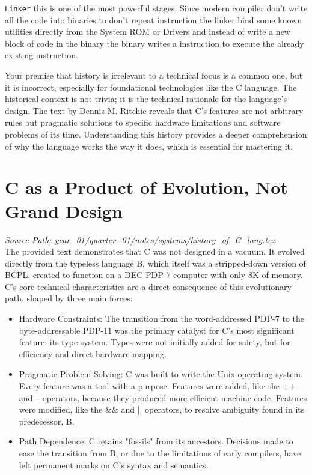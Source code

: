 \documentclass[11pt,a4paper]{report}
\begin{document}
\texttt{Linker} this is one of the most powerful stages. Since modern compiler don't write all the code into binaries to don't repeat instruction the linker bind some known utilities directly from the System ROM or Drivers and instead of write a new block of code in the binary the binary writes a instruction to execute the already existing instruction.



\newpage
Your premise that history is irrelevant to a technical focus is a common one, but it is incorrect, especially for foundational technologies like the C language. The historical context is not trivia; it is the technical rationale for the language's design. The text by Dennis M. Ritchie reveals that C's features are not arbitrary rules but pragmatic solutions to specific hardware limitations and software problems of its time. Understanding this history provides a deeper comprehension of why the language works the way it does, which is essential for mastering it.

\section{C as a Product of Evolution, Not Grand Design}
\noindent\textit{Source Path: \href{https://github.com/TEGDV/QuantitativeSystemsEngineering/blob/main/year_01/quarter_01/notes/systems/history_of_C_lang.tex}{year\_01/quarter\_01/notes/systems/history\_of\_C\_lang.tex}}\\


The provided text demonstrates that C was not designed in a vacuum. It evolved directly from the typeless language B, which itself was a stripped-down version of BCPL, created to function on a DEC PDP-7 computer with only 8K of memory. C's core technical characteristics are a direct consequence of this evolutionary path, shaped by three main forces:

\begin{itemize}
  \item Hardware Constraints: The transition from the word-addressed PDP-7 to the byte-addressable PDP-11 was the primary catalyst for C's most significant feature: its type system. Types were not initially added for safety, but for efficiency and direct hardware mapping.

  \item Pragmatic Problem-Solving: C was built to write the Unix operating system. Every feature was a tool with a purpose. Features were added, like the ++ and -- operators, because they produced more efficient machine code. Features were modified, like the \&\& and || operators, to resolve ambiguity found in its predecessor, B.

  \item Path Dependence: C retains "fossils" from its ancestors. Decisions made to ease the transition from B, or due to the limitations of early compilers, have left permanent marks on C's syntax and semantics.


\end{itemize}
\newpage
\end{document}
